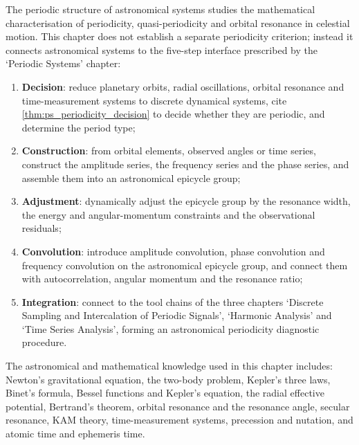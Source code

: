 \begin{remark}\label{rem:astro_chapter_positioning}
The periodic structure of astronomical systems studies the mathematical characterisation of periodicity, quasi-periodicity and orbital resonance in celestial motion. This chapter does not establish a separate periodicity criterion; instead it connects astronomical systems to the five-step interface prescribed by the `Periodic Systems' chapter:
\begin{enumerate}[label=(\arabic*)]
    \item \textbf{Decision}: reduce planetary orbits, radial oscillations, orbital resonance and time-measurement systems to discrete dynamical systems, cite \cref{thm:ps_periodicity_decision} to decide whether they are periodic, and determine the period type;
    \item \textbf{Construction}: from orbital elements, observed angles or time series, construct the amplitude series, the frequency series and the phase series, and assemble them into an astronomical epicycle group;
    \item \textbf{Adjustment}: dynamically adjust the epicycle group by the resonance width, the energy and angular-momentum constraints and the observational residuals;
    \item \textbf{Convolution}: introduce amplitude convolution, phase convolution and frequency convolution on the astronomical epicycle group, and connect them with autocorrelation, angular momentum and the resonance ratio;
    \item \textbf{Integration}: connect to the tool chains of the three chapters `Discrete Sampling and Intercalation of Periodic Signals', `Harmonic Analysis' and `Time Series Analysis', forming an astronomical periodicity diagnostic procedure.
\end{enumerate}
The astronomical and mathematical knowledge used in this chapter includes: Newton's gravitational equation, the two-body problem, Kepler's three laws, Binet's formula, Bessel functions and Kepler's equation, the radial effective potential, Bertrand's theorem, orbital resonance and the resonance angle, secular resonance, KAM theory, time-measurement systems, precession and nutation, and atomic time and ephemeris time.
\end{remark}

